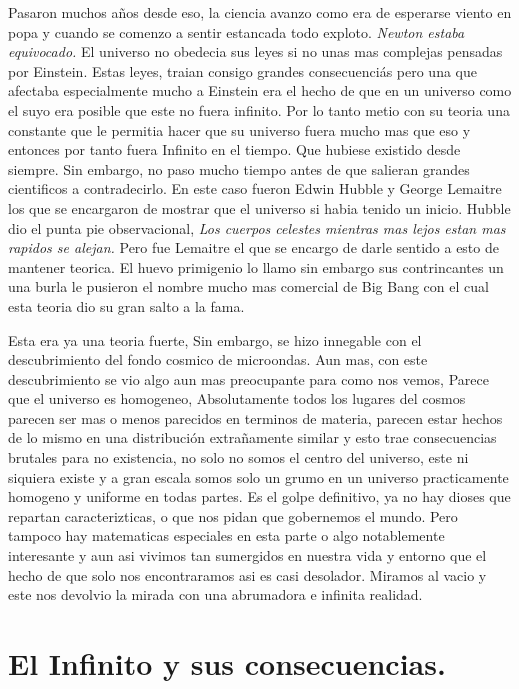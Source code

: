 \documentclass[12pt]{exam}
\begin{document}
\begin{multicols}{2}
Pasaron muchos años desde eso, la ciencia avanzo como era de esperarse viento en popa y cuando se comenzo a sentir estancada
todo exploto. \textit{Newton estaba equivocado.} El universo no obedecia sus leyes si no unas mas complejas pensadas por Einstein.
Estas leyes, traian consigo grandes consecuenciás pero una que afectaba especialmente mucho a Einstein era el hecho de que en un universo
como el suyo era posible que este no fuera infinito. Por lo tanto metio con su teoria una constante que le permitia hacer que su 
universo fuera mucho mas que eso y entonces por tanto fuera Infinito en el tiempo. Que hubiese existido desde siempre. Sin embargo,
no paso mucho tiempo antes de que salieran grandes cientificos a contradecirlo. En este caso fueron Edwin Hubble y George Lemaitre
los que se encargaron de mostrar que el universo si habia tenido un inicio. Hubble dio el punta pie observacional, \textit{Los 
cuerpos celestes mientras mas lejos estan mas rapidos se alejan.} Pero fue Lemaitre el que se encargo de darle sentido a esto de mantener
teorica. El huevo primigenio lo llamo sin embargo sus contrincantes un una burla le pusieron el nombre mucho mas comercial
de Big Bang con el cual esta teoria dio su gran salto a la fama. 

Esta era ya una teoria fuerte, Sin embargo, se hizo innegable con el descubrimiento del fondo cosmico de microondas. 
Aun mas, con este descubrimiento se  vio algo aun mas preocupante para como nos vemos, Parece que el universo es homogeneo,
Absolutamente todos los lugares del cosmos parecen ser mas o menos parecidos en terminos de materia, parecen estar hechos
de lo mismo en una distribución extrañamente similar y esto trae consecuencias brutales para no existencia, no solo no somos
el centro del universo, este ni siquiera existe y a gran escala somos solo un grumo en un universo practicamente homogeno y
uniforme en todas partes. Es el golpe definitivo, ya no hay dioses que repartan caracterizticas, o que nos pidan que gobernemos
el mundo. Pero tampoco hay matematicas especiales en esta parte o algo notablemente interesante y aun asi vivimos tan
sumergidos en nuestra vida y entorno que el hecho de que solo nos encontraramos asi es casi desolador. Miramos al vacio
y este nos devolvio la mirada con una abrumadora e infinita realidad.

\section*{El Infinito y sus consecuencias.}

\end{multicols}
\end{document}
